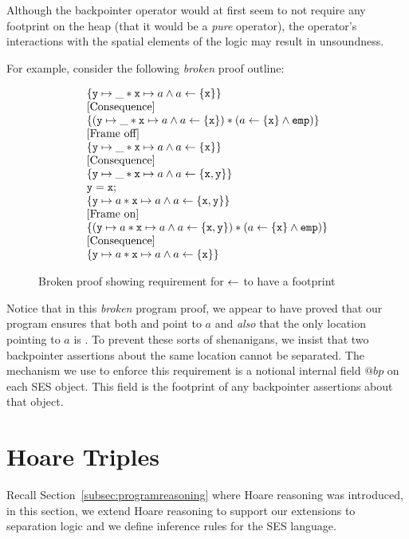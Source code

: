 \documentclass[a4paper,notitlepage]{report}
\begin{document}
Although the backpointer operator would at first seem to not require any
footprint on the heap (that it would be a \emph{pure} operator), the operator's
interactions with the spatial elements of the logic may result in unsoundness.

For example, consider the following \emph{broken} proof outline:

\begin{figure}[h!]
\[
\begin{array}{l}
  \{\mathtt{y}\mapsto\_ \mathbin{*} \mathtt{x} \mapsto a \land a \leftarrow \{\mathtt{x}\} \}\\
  \text{[Consequence]}\\
  \{(\mathtt{y}\mapsto\_ \mathbin{*} \mathtt{x} \mapsto a \land a \leftarrow \{\mathtt{x}\}) \mathbin{*} (a \leftarrow \{\mathtt{x}\} \land \texttt{emp}) \}\\
  \text{[Frame off]}\\
  \{\mathtt{y}\mapsto\_ \mathbin{*} \mathtt{x} \mapsto a \land a \leftarrow \{\mathtt{x}\} \}\\
  \text{[Consequence]}\\
  \{\mathtt{y}\mapsto\_ \mathbin{*} \mathtt{x} \mapsto a \land a \leftarrow \{\mathtt{x},\mathtt{y}\} \}\\
  \mathtt{y = x;}\\
  \{\mathtt{y}\mapsto a \mathbin{*} \mathtt{x} \mapsto a \land a \leftarrow \{\mathtt{x},\mathtt{y}\} \}\\
  \text{[Frame on]}\\
  \{(\mathtt{y}\mapsto a \mathbin{*} \mathtt{x} \mapsto a \land a \leftarrow \{\mathtt{x},\mathtt{y}\}) \mathbin{*} (a \leftarrow \{\mathtt{x}\} \land \texttt{emp}) \}\\
  \text{[Consequence]}\\
  \{\mathtt{y}\mapsto a \mathbin{*} \mathtt{x} \mapsto a \land a \leftarrow \{\mathtt{x}\} \}\\
\end{array}
\]
\caption{Broken proof showing requirement for $\leftarrow$ to have a footprint}
\label{fig:proof-bp-broken}
\end{figure}

Notice that in this \emph{broken} program proof, we appear to have proved that
our program ensures that both  and  point to $a$ and \emph{also}
that the only location pointing to $a$ is . To prevent these sorts of
shenanigans, we insist that two backpointer assertions about the same location
cannot be separated. The mechanism we use to enforce this requirement is a
notional internal field $@bp$ on each SES object. This field is the footprint of
any backpointer assertions about that object.

\section{Hoare Triples}
Recall Section~\ref{subsec:programreasoning} where Hoare reasoning was introduced, in
this section, we extend Hoare reasoning to support our extensions to
separation logic and we define inference rules for the SES language.
\end{document}
